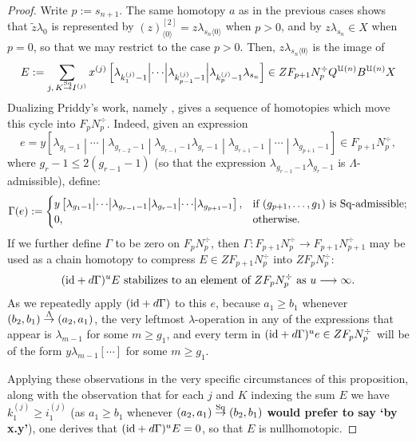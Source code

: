 \documentclass[11pt]{amsart}
\theoremstyle{plain}
\theoremstyle{definition}
\renewcommand{\to}{\longrightarrow}
\newcommand{\calU}{\mathcal{U}}
\theoremstyle{plain}
\newcommand{\restnwithsubscript}[2]{#1^{[2]}_{#2}}
\newcommand{\produces}[3]{#3:#1\sim #2}
\renewcommand{\produces}[3]{#1\rightarrow_{#3} #2}%
\renewcommand{\produces}[3]{#1\overset{\smash{#3}}{\rightarrow} #2}%
\newcommand{\Sq}{\mathrm{Sq}}
\newcommand{\Id}{\textup{id}}
\begin{document}
\begin{Koszul complexes}
\begin{proof}
Write $p:=s_{n+1}$. The same homotopy $a$ as in the previous cases shows that $\widetilde{z}\lambda_0$ is represented by $\restnwithsubscript{(z)}{\langle 0\rangle}=z\lambda_{s_n\langle 0\rangle}$ when $p>0$, and by $z\lambda_{s_n}\in X$ when $p=0$, so that we may restrict to the case $p>0$. Then, $z\lambda_{s_n\langle 0\rangle}$ is the image of
\[E:=\sum_{j,\,\produces{K}{I^{(j)}}{\Sq}}x^{(j)}\left[\lambda_{k_1^{(j)}-1} \middle|\cdots\middle| \lambda_{k_{p-1}^{(j)}-1} \middle|\lambda_{k_{p}^{(j)}-1}\lambda_{s_n} \right]\in ZF_{p+1}N^\div_{p}Q^{\calU(n)}B^{\calU(n)}X\]
Dualizing Priddy's work, namely \cite[proof of Theorem 5.2]{PriddyKoszul.pdf}, gives a sequence of homotopies which move this cycle into $F_pN_p^\div$. Indeed, given an expression
\[e=y\left[\lambda_{g_1-1} \middle|\cdots \middle|\lambda_{g_{r-2}-1}\middle|
\lambda_{g_{r-1}-1}\lambda_{g_r-1}\middle|\lambda_{g_{r+1}-1}\middle|\cdots\middle|\lambda_{g_{p+1}-1}\right]\in F_{p+1}N_p^\div,\]
where $g_{r}-1\leq 2(g_{r-1}-1)$ (so that the expression $\lambda_{g_{r-1}-1}\lambda_{g_r-1}$ is $\Lambda$-admissible), define:
\[\Gamma(e):=\begin{cases}
y\left[\lambda_{g_1-1} \middle|\cdots \middle|
\lambda_{g_{r-1}-1}\middle|\lambda_{g_r-1}\middle|\cdots\middle|\lambda_{g_{p+1}-1}\right],&\textup{if }(g_{p+1},\ldots,g_{1})\textup{ is $\Sq$-admissible};\\
0,&\textup{otherwise}.
\end{cases}\]
If we further define $\Gamma$ to be zero on $F_pN_p^\div$, then $\Gamma:F_{p+1}N^\div_p\to F_{p+1}N^\div_{p+1}$ may be used as a chain homotopy to compress $E\in ZF_{p+1}N^\div_p$ into $ZF_pN^\div_p$:
\[(\Id+d\Gamma)^uE\textup{ stabilizes to an element of } ZF_pN_p^\div\textup{ as $u\to\infty$.}\]
As we repeatedly  apply $(\Id+d\Gamma)$ to this $e$, because $a_1\geq b_1$ whenever $\produces{(b_2,b_1)}{(a_2,a_1)}{\Lambda}$, the very leftmost $\lambda$-operation in any of the expressions that appear is $\lambda_{m-1}$ for some $m\geq g_1$, and every term in $(\Id+d\Gamma)^ue\in ZF_pN_p^\div$ will be of the form $y\lambda_{m-1}[{}\cdots{}]$ for some $m\geq g_1$.

Applying these observations in the very specific circumstances of this proposition, along with the observation that for each $j$ and $K$ indexing the sum $E$ we have $k_1^{(j)}\geq i_1^{(j)}$ (as $a_1\geq b_1$ whenever $\produces{(a_2,a_1)}{(b_2,b_1)}{\Sq}$ \textbf{would prefer to say `by x.y'}), one derives that $(\Id+d\Gamma)^uE=0$, so that $E$ is nullhomotopic. 
%
%
\end{proof}
\end{Koszul complexes}
\end{document}
